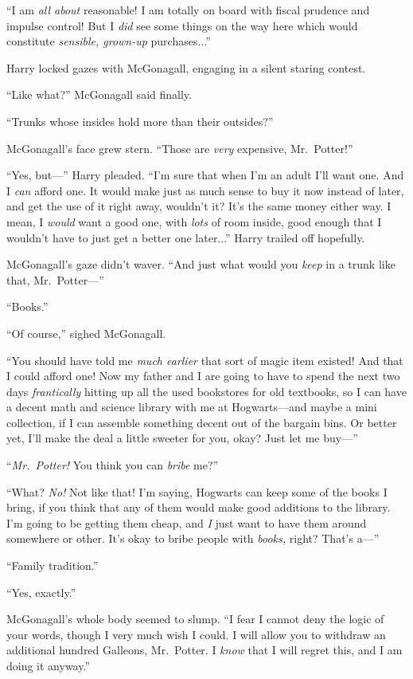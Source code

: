 “I am \emph{all about} reasonable! I am totally on board with fiscal prudence and impulse control! But I \emph{did} see some things on the way here which would constitute \emph{sensible, grown-up} purchases...”

Harry locked gazes with McGonagall, engaging in a silent staring contest.

“Like what?” McGonagall said finally.

“Trunks whose insides hold more than their outsides?”

McGonagall’s face grew stern. “Those are \emph{very} expensive, Mr.~Potter!”

“Yes, but—” Harry pleaded. “I’m sure that when I’m an adult I’ll want one. And I \emph{can} afford one. It would make just as much sense to buy it now instead of later, and get the use of it right away, wouldn’t it? It’s the same money either way. I mean, I \emph{would} want a good one, with \emph{lots} of room inside, good enough that I wouldn’t have to just get a better one later...” Harry trailed off hopefully.

McGonagall’s gaze didn’t waver. “And just what would you \emph{keep} in a trunk like that, Mr.~Potter—”

“Books.”

“Of course,” sighed McGonagall.

“You should have told me \emph{much earlier} that sort of magic item existed! And that I could afford one! Now my father and I are going to have to spend the next two days \emph{frantically} hitting up all the used bookstores for old textbooks, so I can have a decent math and science library with me at Hogwarts—and maybe a mini  collection, if I can assemble something decent out of the bargain bins. Or better yet, I’ll make the deal a little sweeter for you, okay? Just let me buy—”

“\emph{Mr.~Potter!} You think you can \emph{bribe} me?”

“What? \emph{No!} Not like that! I’m saying, Hogwarts can keep some of the books I bring, if you think that any of them would make good additions to the library. I’m going to be getting them cheap, and \emph{I} just want to have them around somewhere or other. It’s okay to bribe people with \emph{books,} right? That’s a—”

“Family tradition.”

“Yes, exactly.”

McGonagall’s whole body seemed to slump. “I fear I cannot deny the logic of your words, though I very much wish I could. I will allow you to withdraw an additional hundred Galleons, Mr.~Potter. I \emph{know} that I will regret this, and I am doing it anyway.”

